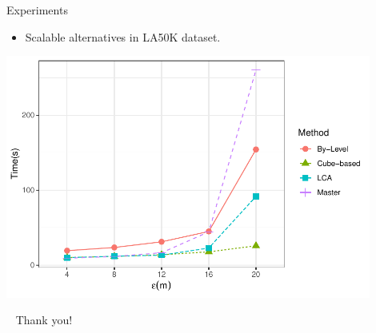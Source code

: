 \documentclass{beamer}
\begin{document}
    \begin{frame}{Experiments}
        \begin{itemize}
            \item Scalable alternatives in LA50K dataset.
        \end{itemize} \vspace{0.25cm}

        \centering
        \includegraphics[width=0.9\textwidth]
                {../thesis/chapter4/figures/plots/08_sequential_parallel/la50k_e}
    \end{frame}

    \begin{frame}{ \ }
        \LARGE Thank you!
    \end{frame}
\end{document}
